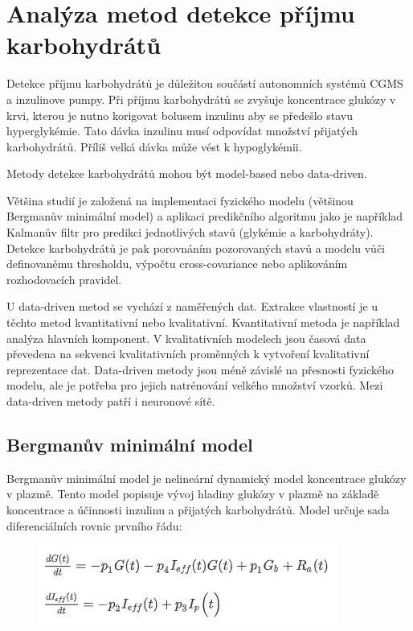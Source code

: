 \chapter{Analýza metod detekce příjmu karbohydrátů}

Detekce příjmu karbohydrátů je důležitou součástí autonomních systémů CGMS a inzulinove pumpy. Při příjmu karbohydrátů se zvyšuje koncentrace glukózy v krvi, kterou je nutno korigovat bolusem inzulinu aby se předešlo stavu hyperglykémie. Tato dávka inzulinu musí odpovídat množství přijatých karbohydrátů. Příliš velká dávka může vést k hypoglykémii.

Metody detekce karbohydrátů mohou být model-based nebo data-driven.

Většina studií je založená na implementaci fyzického modelu (většinou Bergmanův minimální model) a aplikaci predikčního algoritmu jako je například Kalmanův filtr pro predikci jednotlivých stavů (glykémie a karbohydráty). Detekce karbohydrátů je pak porovnáním pozorovaných stavů a modelu vůči definovanému thresholdu, výpočtu cross-covariance nebo aplikováním rozhodovacích pravidel.

U data-driven metod se vychází z naměřených dat. Extrakce vlastností je u těchto metod kvantitativní nebo kvalitativní. Kvantitativní metoda je například analýza hlavních komponent. V kvalitativních modelech jsou časová data převedena na sekvenci kvalitativních proměnných k vytvoření kvalitativní reprezentace dat. Data-driven metody jsou méně závislé na přesnosti fyzického modelu, ale je potřeba pro jejich natrénování velkého množství vzorků. Mezi data-driven metody patří i neuronové sítě.

\section{Bergmanův minimální model}

Bergmanův minimální model \citep{Analyza.Bergman} je nelineární dynamický model koncentrace glukózy v plazmě. Tento model popisuje vývoj hladiny glukózy v plazmě na základě koncentrace a účinnosti inzulinu a přijatých karbohydrátů. Model určuje sada diferenciálních rovnic prvního řádu:

\begin{figure}[H]{
\label{fig:bergman1}
\includegraphics{img/analyza/bergman1.jpg}}
\end{figure}

